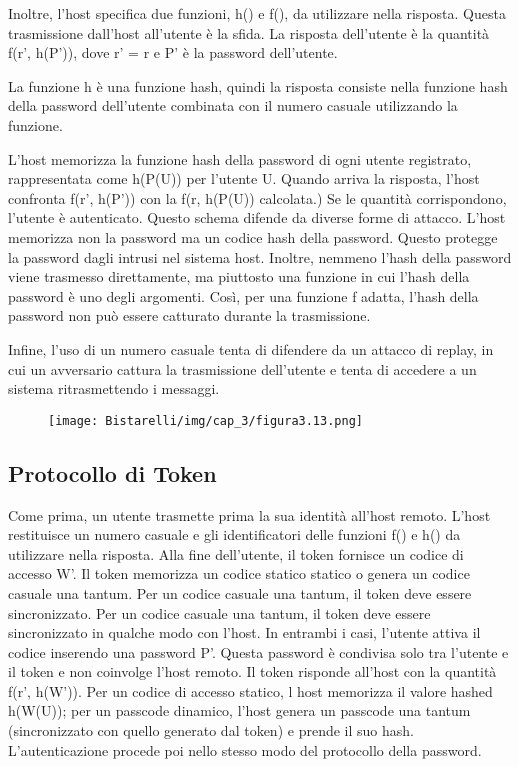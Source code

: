 \singlespacing

Inoltre, l'host specifica due funzioni, h() e f(), da utilizzare nella risposta. Questa trasmissione dall'host all'utente è la sfida. La risposta dell'utente è la quantità f(r', h(P')), dove r' = r e P' è la password dell'utente.

\singlespacing

La funzione h è una funzione hash, quindi la risposta consiste nella funzione hash della password dell'utente combinata con il numero casuale utilizzando la funzione.

\singlespacing

L'host memorizza la funzione hash della password di ogni utente registrato, rappresentata come h(P(U)) per l'utente U. Quando arriva la risposta, l'host confronta f(r', h(P')) con la f(r, h(P(U)) calcolata.) Se le quantità corrispondono, l'utente è autenticato. Questo schema difende da diverse forme di attacco. L'host memorizza non la password ma un codice hash della password. Questo protegge la password dagli intrusi nel sistema host. Inoltre, nemmeno l'hash della password viene trasmesso direttamente, ma piuttosto una funzione in cui l'hash della password è uno degli argomenti. Così, per una funzione f adatta, l'hash della password non può essere catturato durante la trasmissione.

\singlespacing

Infine, l'uso di un numero casuale tenta di difendere da un attacco di replay, in cui un avversario cattura la trasmissione dell'utente e tenta di accedere a un sistema ritrasmettendo i messaggi.
\begin{figure}[H]
	\centering
    \texttt{[image: Bistarelli/img/cap\_3/figura3.13.png]}
\end{figure}
\subsection{Protocollo di Token}
Come prima, un utente trasmette prima la sua identità all'host remoto. L'host restituisce un numero casuale e gli identificatori delle funzioni f() e h() da utilizzare nella risposta. Alla fine dell'utente, il token fornisce un codice di accesso W'. Il token memorizza un codice statico statico o genera un codice casuale una tantum. Per un codice casuale una tantum, il token deve essere sincronizzato. Per un codice casuale una tantum, il token deve essere sincronizzato in qualche modo con l'host. In entrambi i casi, l'utente attiva il codice inserendo una password P'. Questa password è condivisa solo tra l'utente e il token e non coinvolge l'host remoto. Il token risponde all'host con la quantità f(r', h(W')). Per un codice di accesso statico, l host memorizza il valore hashed h(W(U)); per un passcode dinamico, l'host genera un passcode una tantum (sincronizzato con quello generato dal token) e prende il suo hash. L'autenticazione procede poi nello stesso modo del protocollo della password.
